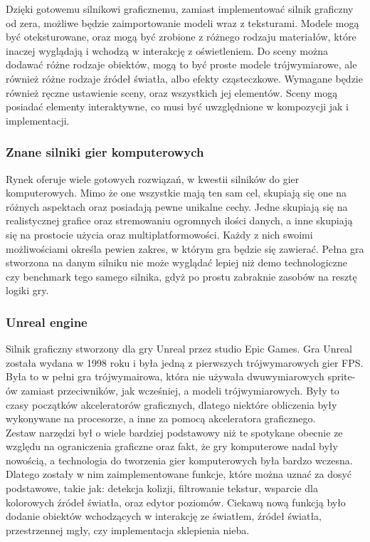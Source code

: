 \documentclass{article} %
\begin{document}
        Dzięki gotowemu silnikowi graficznemu, zamiast implementować silnik graficzny od zera, możliwe będzie zaimportowanie modeli wraz z teksturami. Modele mogą być oteksturowane, oraz mogą być zrobione z różnego rodzaju materiałów, które inaczej wyglądają i wchodzą w interakcję z oświetleniem. Do sceny można dodawać różne rodzaje obiektów, mogą to być proste modele trójwymiarowe, ale również różne rodzaje źródeł światła, albo efekty cząsteczkowe. Wymagane będzie również ręczne ustawienie sceny, oraz wszystkich jej elementów. Sceny mogą posiadać elementy interaktywne, co musi być uwzględnione w kompozycji jak i implementacji.
        \\
                      
        \subsubsection{Znane silniki gier komputerowych}
        Rynek oferuje wiele gotowych rozwiązań, w kwestii silników do gier komputerowych. Mimo że one wszystkie mają ten sam cel, skupiają się one na różnych aspektach oraz posiadają pewne unikalne cechy. Jedne skupiają się na realistycznej grafice oraz stremowaniu ogromnych ilości danych, a inne skupiają się na prostocie użycia oraz multiplatformowości. Każdy z nich swoimi możliwościami określa pewien zakres, w którym gra będzie się zawierać. \cite{comparason} Pełna gra stworzona na danym silniku nie może wyglądać lepiej niż demo technologiczne czy benchmark tego samego silnika, gdyż po prostu zabraknie zasobów na resztę logiki gry.
        \\
        
        \subsubsection*{Unreal engine}
        Silnik graficzny stworzony dla gry Unreal przez studio Epic Games. Gra Unreal została wydana w 1998 roku i była jedną z pierwszych trójwymarowych gier FPS. Była to w pełni gra trójwymairowa, która nie używała dwuwymiarowych sprite-ów zamiast przeciwników, jak wcześniej, a modeli trójwymiarowych. Były to czasy początków akceleratorów graficznych, dlatego niektóre obliczenia były wykonywane na procesorze, a inne za pomocą akceleratora graficznego.
        \\
        
        Zestaw narzędzi był o wiele bardziej podstawowy niż te spotykane obecnie ze względu na ograniczenia graficzne oraz fakt, że gry komputerowe nadal były nowością, a technologia do tworzenia gier komputerowych była bardzo wczesna. Dlatego zostały w nim zaimplementowane funkcje, które można uznać za dosyć podstawowe, takie jak: detekcja kolizji, filtrowanie tekstur, wsparcie dla kolorowych źródeł światła, oraz edytor poziomów. Ciekawą nową funkcją było dodanie obiektów wchodzących w interakcję ze światłem, źródeł światła, przestrzennej mgły, czy implementacja sklepienia nieba.
        \\
        
\end{document}
